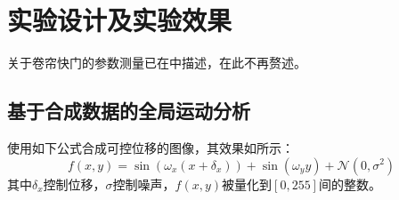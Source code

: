 
\section{实验设计及实验效果}
关于卷帘快门的参数测量已在中描述，在此不再赘述。

\subsection{基于合成数据的全局运动分析}
使用如下公式合成可控位移的图像，其效果如所示：
\begin{equation}
    f(x, y) = \sin(\omega_x (x + \delta_x)) + \sin(\omega_y y) + 
    \mathcal{N}(0, \sigma^2)
\end{equation}
其中$\delta_x$控制位移，$\sigma$控制噪声，$f(x, y)$被量化到$[0, 255]$间的整数。
